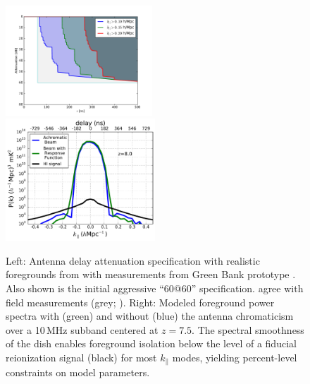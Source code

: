 \documentclass[preprint,11pt]{aastex}
\begin{document}
\begin{figure}[h!]
	\centering
    \includegraphics[width=0.49\textwidth]{plots/delayspecplot.pdf}
     \includegraphics[width=0.5\textwidth]{plots/ps1d_with_delay_kernel.pdf}
	\vspace{-25pt}
	\caption{Left:  Antenna delay attenuation specification with realistic foregrounds from \cite{thyagarajan_et_al2016} with measurements from Green Bank prototype \citep{patra_et_al2016}.  Also shown is the initial aggressive ``60@60'' specification.
       agree with field measurements (grey; \citealt{patra_et_al2016}). 
Right: Modeled foreground power spectra with (green) and without (blue) the antenna chromaticism over a 10\,MHz subband centered at $z=7.5$. The spectral smoothness of the dish enables foreground isolation below the level of a fiducial reionization signal (black) for most $k_{\parallel}$ modes, yielding percent-level constraints on model parameters.}
	\label{fig:delayspec}
	\vspace{-10pt}
\end{figure}
\end{document}
